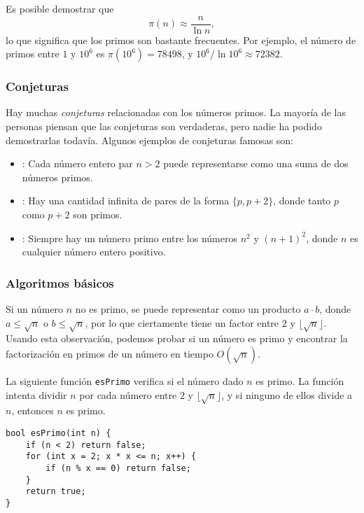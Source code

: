 Es posible demostrar que
\[\pi(n) \approx \frac{n}{\ln n},\]
lo que significa que los primos son bastante frecuentes.
Por ejemplo, el número de primos entre
$1$ y $10^6$ es $\pi(10^6)=78498$,
y $10^6 / \ln 10^6 \approx 72382$.

\subsubsection{Conjeturas}

Hay muchas \emph{conjeturas} relacionadas con los números primos.
La mayoría de las personas piensan que las conjeturas son verdaderas,
pero nadie ha podido demostrarlas todavía. Algunos ejemplos de conjeturas
famosas son:

\begin{itemize}
    \item {}:
          Cada número entero par $n>2$ puede representarse como una
          suma de dos números primos.
    \item {}:
          Hay una cantidad infinita de pares
          de la forma $\{p,p+2\}$,
          donde tanto $p$ como $p+2$ son primos.
    \item {}:
          Siempre hay un número primo entre los números
          $n^2$ y $(n+1)^2$, donde $n$ es cualquier número entero positivo.
\end{itemize}

\subsubsection{Algoritmos básicos}

Si un número $n$ no es primo,
se puede representar como un producto $a \cdot b$,
donde $a \le \sqrt n$ o $b \le \sqrt n$,
por lo que ciertamente tiene un factor entre $2$ y $\lfloor \sqrt n \rfloor$.
Usando esta observación, podemos probar
si un número es primo y encontrar la factorización en primos
de un número en tiempo $O(\sqrt n)$.

La siguiente función \texttt{esPrimo} verifica
si el número dado $n$ es primo.
La función intenta dividir $n$ por
cada número entre $2$ y $\lfloor \sqrt n \rfloor$,
y si ninguno de ellos divide a $n$, entonces $n$ es primo.

\begin{lstlisting}
bool esPrimo(int n) {
    if (n < 2) return false;
    for (int x = 2; x * x <= n; x++) {
        if (n % x == 0) return false;
    }
    return true;
}
\end{lstlisting}

